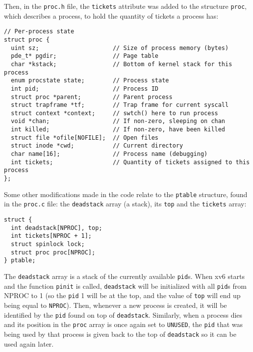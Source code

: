 \documentclass[12pt]{article}
\begin{document}
Then, in the \texttt{proc.h} file, the \texttt{tickets} attribute was added to the structure \texttt{proc}, which describes a process, to hold the quantity of tickets a process has:

\begin{scriptsize}
\begin{verbatim}
// Per-process state
struct proc {
  uint sz;                     // Size of process memory (bytes)
  pde_t* pgdir;                // Page table
  char *kstack;                // Bottom of kernel stack for this process
  enum procstate state;        // Process state
  int pid;                     // Process ID
  struct proc *parent;         // Parent process
  struct trapframe *tf;        // Trap frame for current syscall
  struct context *context;     // swtch() here to run process
  void *chan;                  // If non-zero, sleeping on chan
  int killed;                  // If non-zero, have been killed
  struct file *ofile[NOFILE];  // Open files
  struct inode *cwd;           // Current directory
  char name[16];               // Process name (debugging)
  int tickets;                 // Quantity of tickets assigned to this process
};
\end{verbatim}
\end{scriptsize}

Some other modifications made in the code relate to the \texttt{ptable} structure, found in the \texttt{proc.c} file: the \texttt{deadstack} array (a stack), its \texttt{top} and the \texttt{tickets} array:

\begin{scriptsize}
\begin{verbatim}
struct {
  int deadstack[NPROC], top;
  int tickets[NPROC + 1];
  struct spinlock lock;
  struct proc proc[NPROC];
} ptable;
\end{verbatim}
\end{scriptsize}

The \texttt{deadstack} array is a stack of the currently available \texttt{pid}s. When xv6 starts and the function \texttt{pinit} is called, \texttt{deadstack} will be initialized with all \texttt{pid}s from NPROC to 1 (so the \texttt{pid} 1 will be at the top, and the value of \texttt{top} will end up being equal to \texttt{NPROC}). Then, whenever a new process is created, it will be identified by the \texttt{pid} found on top of \texttt{deadstack}. Similarly, when a process dies and its position in the \texttt{proc} array is once again set to \texttt{UNUSED}, the \texttt{pid} that was being used by that process is given back to the top of \texttt{deadstack} so it can be used again later.
\end{document}
